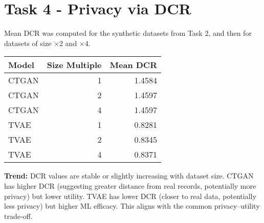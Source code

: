 \documentclass[12pt]{article}
\begin{document}
\section*{Task 4 - Privacy via DCR}
Mean DCR was computed for the synthetic datasets from Task 2, and then for datasets of size $\times$2 and $\times$4.

\begin{tabular}{l r r}
\toprule
Model & Size Multiple & Mean DCR \\
\midrule
CTGAN & 1 & 1.4584 \\
CTGAN & 2 & 1.4597 \\
CTGAN & 4 & 1.4597 \\
TVAE  & 1 & 0.8281 \\
TVAE  & 2 & 0.8345 \\
TVAE  & 4 & 0.8371 \\
\bottomrule
\end{tabular}

\vspace{10pt}
\noindent \textbf{Trend:} DCR values are stable or slightly increasing with dataset size. CTGAN has higher DCR (suggesting greater distance from real records, potentially more privacy) but lower utility. TVAE has lower DCR (closer to real data, potentially less privacy) but higher ML efficacy. This aligns with the common privacy--utility trade-off.
\end{document}
